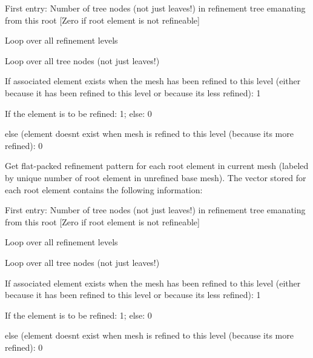 \begin{DoxyItemize}
\item First entry\+: Number of tree nodes (not just leaves!) in refinement tree emanating from this root \mbox{[}Zero if root element is not refineable\mbox{]}
\item Loop over all refinement levels
\begin{DoxyItemize}
\item Loop over all tree nodes (not just leaves!)
\begin{DoxyItemize}
\item If associated element exists when the mesh has been refined to this level (either because it has been refined to this level or because it\textquotesingle{}s less refined)\+: 1
\begin{DoxyItemize}
\item If the element is to be refined\+: 1; else\+: 0
\end{DoxyItemize}
\item else (element doesn\textquotesingle{}t exist when mesh is refined to this level (because it\textquotesingle{}s more refined)\+: 0
\end{DoxyItemize}
\end{DoxyItemize}
\end{DoxyItemize}Get flat-\/packed refinement pattern for each root element in current mesh (labeled by unique number of root element in unrefined base mesh). The vector stored for each root element contains the following information\+:
\begin{DoxyItemize}
\item First entry\+: Number of tree nodes (not just leaves!) in refinement tree emanating from this root \mbox{[}Zero if root element is not refineable\mbox{]}
\item Loop over all refinement levels
\begin{DoxyItemize}
\item Loop over all tree nodes (not just leaves!)
\begin{DoxyItemize}
\item If associated element exists when the mesh has been refined to this level (either because it has been refined to this level or because it\textquotesingle{}s less refined)\+: 1
\begin{DoxyItemize}
\item If the element is to be refined\+: 1; else\+: 0
\end{DoxyItemize}
\item else (element doesn\textquotesingle{}t exist when mesh is refined to this level (because it\textquotesingle{}s more refined)\+: 0
\end{DoxyItemize}
\end{DoxyItemize}
\end{DoxyItemize}

